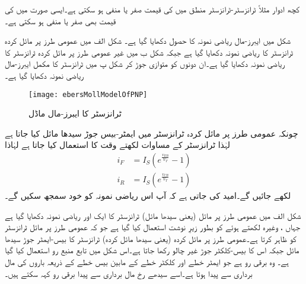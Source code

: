 کچھ ادوار مثلاً ٹرانزسٹر-ٹرانزسٹر منطق میں  کی قیمت صفر یا منفی ہو سکتی ہے۔ایسی صورت میں  کی قیمت بھی صفر یا منفی ہو سکتی ہے۔

شکل  میں ایبرز-مال ریاضی نمونہ  کا حصول دکھایا گیا ہے۔ شکل  الف   میں عمومی طرز پر مائل کردہ   ٹرانزسٹر کا ریاضی نمونہ  دکھایا گیا ہے جبکہ شکل  ب میں غیر عمومی طرز پر مائل کردہ ٹرانزسٹر کا ریاضی نمونہ  دکھایا گیا ہے۔ان دونوں کو متوازی جوڑ کر شکل  پ میں  ٹرانزسٹر کا مکمل ایبرز-مال ریاضی نمونہ  دکھایا گیا ہے۔
\begin{figure}
\centering
\texttt{[image: ebersMollModelOfPNP]}
\caption{ ٹرانزسٹر کا ایبرز-مال ماڈل}
\label{شکل_ایبر_مال_ماڈل_جمع_منفی_جمع_ٹرانزسٹر}
\end{figure}
چونکہ عمومی طرز پر مائل کردہ  ٹرانزسٹر میں ایمٹر-بیس   جوڑ سیدھا مائل کیا جاتا ہے لہٰذا   ٹرانزسٹر کے مساوات لکھتے وقت  کا استعمال کیا جاتا ہے لہٰاذا
\begin{align*}
i_F&=I_S \left (e^{\frac{v_{EB}}{V_T}}-1 \right )\\
i_R&=I_S \left (e^{\frac{v_{CB}}{V_T}}-1 \right )
\end{align*}
لکھے جائیں گے۔امید کی جاتی ہے کہ آپ اس ریاضی نمونہ  کو خود سمجھ سکیں گے۔

شکل  الف میں عمومی طرز پر مائل (یعنی سیدھا مائل)   ٹرانزسٹر کا ایک اور ریاضی نمونہ  دکھایا گیا ہے جہاں   ،  وغیرہ لکھتے ہوئے  کو بطور زیرِ نوشت استعمال کیا گیا ہے جو کہ عمومی طرز پر مائل ٹرانزسٹر کو ظاہر کرتا ہے۔عمومی طرز پر مائل کردہ (یعنی سیدھا مائل کردہ) ٹرانزسٹر  کا بیس-ایمٹر جوڑ سیدھا مائل جبکہ اس کا بیس-کلکٹر جوڑ غیر چالو رکھا جاتا ہے۔اس شکل میں تابع منبع رو استعمال کیا گیا ہے۔ وہ برقی رو ہے جو ایمٹر خطے اور کلکٹر  خطے کے مابین بیس خطے کے ذریعہ باروں کی مال برداری سے پیدا ہوتا ہے۔اسے سیدھے رخ مال برداری سے پیدا برقی رو کہہ سکتے ہیں۔

